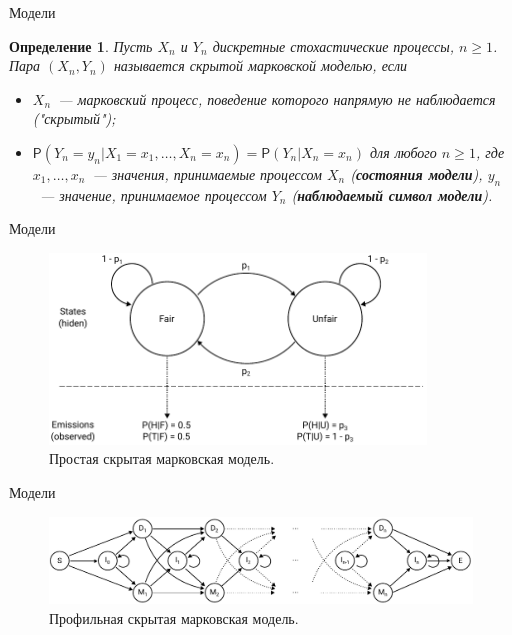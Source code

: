 \documentclass{beamer}
\newtheorem{defenition}{Определение}
\begin{document}
	\begin{frame}{Модели}
		\begin{defenition}
			Пусть $X_{n}$ и $Y_{n}$ дискретные стохастические процессы, $n \geq 1$. Пара $(X_{n}, Y_{n})$ называется скрытой марковской моделью, если
			\begin{itemize}
				\item $X_{n}$~--- марковский процесс, поведение которого напрямую не наблюдается ("скрытый");
				\item $\mathsf{P}(Y_{n} = y_{n}|X_{1} = x_{1},\dots, X_{n} = x_{n}) = \mathsf{P}(Y_{n}|X_{n}=x_{n})$ для любого $n \geq 1$, где $x_{1},\dots,x_{n}$~--- значения, принимаемые процессом  $X_{n}$ (\textbf{состояния модели}), $ y_{n}$~--- значение, принимаемое процессом $Y_{n}$ (\textbf{наблюдаемый символ модели}).
			\end{itemize}
		\end{defenition}		
	\end{frame}

	\begin{frame}{Модели}
		\begin{figure}[h]
			\includegraphics[width=10cm]{../report/figure1}
			\caption{Простая скрытая марковская модель.}
		\end{figure}
	\end{frame}

	\begin{frame}{Модели}
		\begin{figure}[h]
			\includegraphics[width=12cm]{../report/figure2}
			\caption{Профильная скрытая марковская модель.}
		\end{figure}		
	\end{frame}
\end{document}
